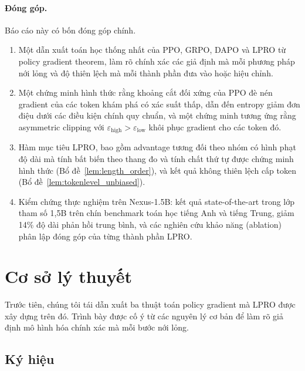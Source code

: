 \documentclass[11pt,a4paper]{article}
\begin{document}
\paragraph{Đóng góp.} Báo cáo này có bốn đóng góp chính.
\begin{enumerate}[leftmargin=*]
  \item Một dẫn xuất toán học thống nhất của PPO, GRPO, DAPO và LPRO từ policy
        gradient theorem, làm rõ chính xác các giả định mà mỗi phương pháp
        nới lỏng và độ thiên lệch mà mỗi thành phần đưa vào hoặc hiệu chỉnh.
  \item Một chứng minh hình thức rằng khoảng cắt đối xứng của PPO đè nén
        gradient của các token khám phá có xác suất thấp, dẫn đến entropy
        giảm đơn điệu dưới các điều kiện chính quy chuẩn, và một chứng minh tương ứng rằng
        asymmetric clipping với \(\varepsilon_{\text{high}}>\varepsilon_{\text{low}}\) khôi phục
        gradient cho các token đó.
  \item Hàm mục tiêu LPRO, bao gồm advantage tương đối theo nhóm có hình phạt độ dài
        mà tính bất biến theo thang đo và tính chất thứ tự được chứng minh hình thức
        (Bổ đề~\ref{lem:length_order}), và kết quả không thiên lệch cấp token
        (Bổ đề~\ref{lem:tokenlevel_unbiased}).
  \item Kiểm chứng thực nghiệm trên Nexus-1.5B: kết quả state-of-the-art trong
        lớp tham số 1,5B trên chín benchmark toán học tiếng Anh và tiếng Trung,
        giảm 14\% độ dài phản hồi trung bình, và các nghiên cứu khảo năng (ablation)
        phân lập đóng góp của từng thành phần LPRO.
\end{enumerate}

\section{Cơ sở lý thuyết}

Trước tiên, chúng tôi tái dẫn xuất ba thuật toán policy gradient mà LPRO được xây dựng trên đó.
Trình bày được cố ý từ các nguyên lý cơ bản để làm rõ giả định mô hình hóa chính xác
mà mỗi bước nới lỏng.

\subsection{Ký hiệu}
\end{document}
